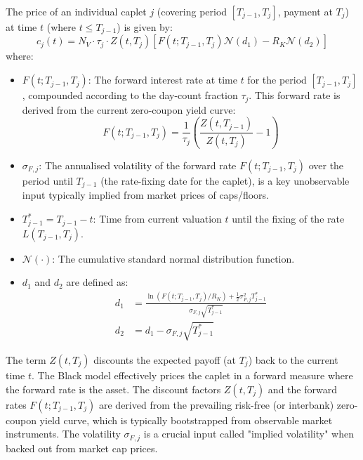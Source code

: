 \documentclass[11pt, a4paper, british]{article}
\begin{document}
The price of an individual caplet $j$ (covering period $[T_{j-1}, T_j]$, payment at $T_j$) at time $t$ (where $t \le T_{j-1}$) is given by:
\begin{equation}
 c_j(t) = N_V \cdot \tau_j \cdot Z(t, T_j) \left[ F(t; T_{j-1}, T_j) \mathcal{N}(d_1) - R_K \mathcal{N}(d_2) \right]
 \label{eq:caplet_black_model}
\end{equation}
where:
\begin{itemize}
 \item $F(t; T_{j-1}, T_j)$: The forward interest rate at time $t$ for the period $[T_{j-1}, T_j]$, compounded according to the day-count fraction $\tau_j$. This forward rate is derived from the current zero-coupon yield curve:
 \begin{equation}
 F(t; T_{j-1}, T_j) = \frac{1}{\tau_j} \left( \frac{Z(t, T_{j-1})}{Z(t, T_j)} - 1 \right)
 \label{eq:forward_rate_from_zeros}
 \end{equation}
 \item $\sigma_{F,j}$: The annualised volatility of the forward rate $F(t; T_{j-1}, T_j)$ over the period until $T_{j-1}$ (the rate-fixing date for the caplet), is a key unobservable input typically implied from market prices of caps/floors.
 \item $T_{j-1}^* = T_{j-1} - t$: Time from current valuation $t$ until the fixing of the rate $L(T_{j-1}, T_j)$.
 \item $\mathcal{N}(\cdot)$: The cumulative standard normal distribution function.
 \item $d_1$ and $d_2$ are defined as:
 \begin{align}
 d_1 &= \frac{\ln(F(t; T_{j-1}, T_j) / R_K) + \frac{1}{2}\sigma_{F,j}^2 T_{j-1}^*}{\sigma_{F,j} \sqrt{T_{j-1}^*}} \label{eq:caplet_d1} \\
 d_2 &= d_1 - \sigma_{F,j} \sqrt{T_{j-1}^*} \label{eq:caplet_d2}
 \end{align}
\end{itemize}
The term $Z(t, T_j)$ discounts the expected payoff (at $T_j$) back to the current time $t$. The Black model effectively prices the caplet in a forward measure where the forward rate is the asset. The discount factors $Z(t, T_j)$ and the forward rates $F(t; T_{j-1}, T_j)$ are derived from the prevailing risk-free (or interbank) zero-coupon yield curve, which is typically bootstrapped from observable market instruments. The volatility $\sigma_{F,j}$ is a crucial input called "implied volatility" when backed out from market cap prices.

\newpage
\end{document}
